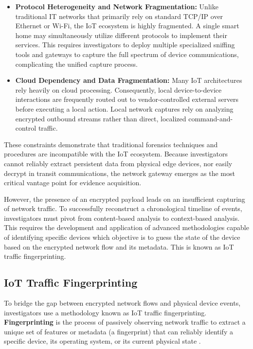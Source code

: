 \begin{itemize}
	\item \textbf{Protocol Heterogeneity and Network Fragmentation:} Unlike traditional IT networks that primarily rely on standard TCP/IP over Ethernet or Wi-Fi, the IoT ecosystem is highly fragmented. A single smart home may simultaneously utilize different protocols to implement their services. This requires investigators to deploy multiple specialized sniffing tools and gateways to capture the full spectrum of device communications, complicating the unified capture process.
	
	\item \textbf{Cloud Dependency and Data Fragmentation:} Many IoT architectures rely heavily on cloud processing. Consequently, local device-to-device interactions are frequently routed out to vendor-controlled external servers before executing a local action. Local network captures rely on analyzing encrypted outbound streams rather than direct, localized command-and-control traffic.
\end{itemize}

These constraints demonstrate that traditional forensics techniques and procedures are incompatible with the IoT ecosystem. Because investigators cannot reliably extract persistent data from physical edge devices, nor easily decrypt in transit communications, the network gateway emerges as the most critical vantage point for evidence acquisition. 

However, the presence of an encrypted payload leads on an insufficient capturing of network traffic. To successfully reconstruct a chronological timeline of events, investigators must pivot from content-based analysis to context-based analysis. This requires the development and application of advanced methodologies capable of identifying specific devices which objective is to guess the state of the device based on the encrypted network flow and its metadata. This is known as IoT traffic fingerprinting. 


\subsection{IoT Traffic Fingerprinting}
To bridge the gap between encrypted network flows and physical device events, investigators use a methodology known as IoT traffic fingerprinting. \textbf{Fingerprinting} is the process of passively observing network traffic to extract a unique set of features or metadata (a fingerprint) that can reliably identify a specific device, its operating system, or its current physical state \cite{Miettinen2017}.

